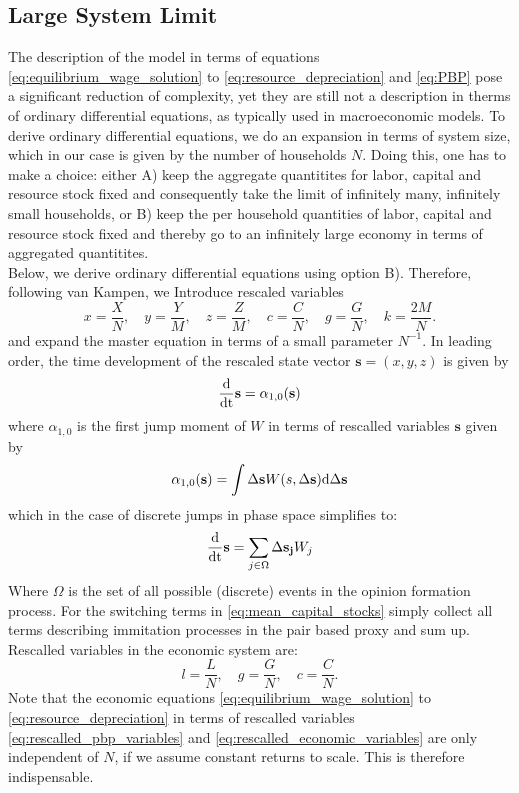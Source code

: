 \subsection{Large System Limit}
\label{large_system_limit}
The description of the model in terms of equations \eqref{eq:equilibrium_wage_solution} to \eqref{eq:resource_depreciation} and \eqref{eq:PBP} pose a significant reduction of complexity, yet they are still not a description in therms of ordinary differential equations, as typically used in macroeconomic models. To derive ordinary differential equations, we do an expansion in terms of system size, which in our case is given by the number of households $N$.
Doing this, one has to make a choice: either A) keep the aggregate quantitites for labor, capital and resource stock fixed and consequently take the limit of infinitely many, infinitely small households, or B) keep the per household quantities of labor, capital and resource stock fixed and thereby go to an infinitely large economy in terms of aggregated quantitites. \\
Below, we derive ordinary differential equations using option B). Therefore, following van Kampen, we Introduce rescaled variables
\begin{equation}
	x = \frac{X}{N}, \quad y = \frac{Y}{M}, \quad z = \frac{Z}{M}, \quad c = \frac{C}{N}, \quad g = \frac{G}{N}, \quad k = \frac{2M}{N}.
	\label{eq:rescalled_pbp_variables}
\end{equation}
and expand the master equation in terms of a small parameter $N^{-1}$. In leading order, the time development of the rescaled state vector $\mathbf{s} = (x, y, z)$ is given by 
\begin{equation}
	\frac{\rm{d}}{\rm{d}t}\mathbf{s} = \alpha_{1,0}(\mathbf{s})
	\label{macroscopic_equation}
\end{equation}
where $\alpha_{1,0}$ is the first jump moment of $W$ in terms of rescalled variables $\mathbf{s}$ given by
\begin{equation}
	\alpha_{1,0}(\mathbf{s}) = \int \Delta \mathbf{s} W(s, \Delta \mathbf{s}) {\rm d} \Delta \mathbf{s}
	\label{eq:jump_moment}
\end{equation}
which in the case of discrete jumps in phase space simplifies to:
\begin{equation}
	\frac{\rm{d}}{\rm{d}t}\mathbf{s} = \sum_{j \in \Omega}  \Delta \mathbf{s_j} W_j 
	\label{eq:transitions}
\end{equation}
Where $\Omega$ is the set of all possible (discrete) events in the opinion formation process.
For the switching terms in \eqref{eq:mean_capital_stocks} simply collect all terms describing immitation processes in the pair based proxy and sum up.
Rescalled variables in the economic system are:
\begin{equation}
	l = \frac{L}{N}, \quad g = \frac{G}{N}, \quad c = \frac{C}{N}.
	\label{eq:rescalled_economic_variables}
\end{equation}
Note that the economic equations \eqref{eq:equilibrium_wage_solution} to \eqref{eq:resource_depreciation} in terms of rescalled variables \eqref{eq:rescalled_pbp_variables} and \eqref{eq:rescalled_economic_variables} are only independent of $N$, if we assume constant returns to scale. This is therefore indispensable.


